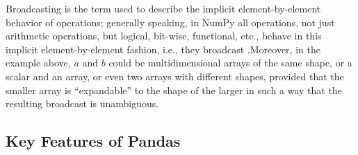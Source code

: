 Broadcasting is the term used to describe the implicit element-by-element behavior
of operations; generally speaking, in NumPy all operations, not just arithmetic
operations, but logical, bit-wise, functional, etc., behave in this implicit
element-by-element fashion, i.e., they broadcast \cite{NumPy:2024} .Moreover, in
the example above, $a$ and $b$ could be multidimensional arrays of the same
shape, or a scalar and an array, or even two arrays with different shapes, provided
that the smaller array is “expandable” to the shape of the larger in such a way that
the resulting broadcast is unambiguous.

\subsection{Key Features of Pandas}

